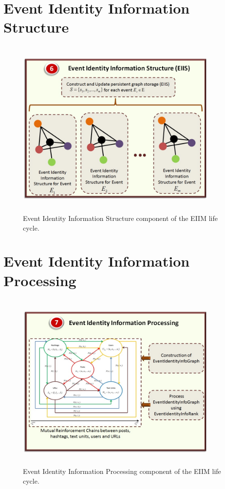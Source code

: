 \section{Event Identity Information Structure}

\begin{figure}[htbp]
  \caption{Event Identity Information Structure component of the EIIM life cycle.}
  \centering
    \includegraphics[width=10cm,height=9cm]{Figures/EIIMComponents/EventIdentityInformationStructure.jpg}
\end{figure}

\section{Event Identity Information Processing\label{EventIdentityInformationProcessing}}

\begin{figure}[htbp]
  \caption{Event Identity Information Processing component of the EIIM life cycle.}
  \centering
    \includegraphics[width=10cm,height=9cm]{Figures/EIIMComponents/EventIdentityInformationProcessing.jpg}
\end{figure}


